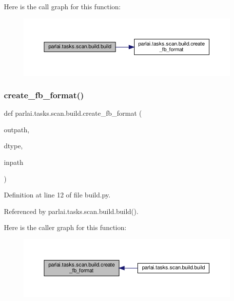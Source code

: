 Here is the call graph for this function\+:
\nopagebreak
\begin{figure}[H]
\begin{center}
\leavevmode
\includegraphics[width=350pt]{namespaceparlai_1_1tasks_1_1scan_1_1build_ad191bbde08667e24f385a91cb8bd235a_cgraph}
\end{center}
\end{figure}
\mbox{\label{namespaceparlai_1_1tasks_1_1scan_1_1build_acd920598e2932f5f8db51dcf6e25a00c}} 
\subsubsection{\texorpdfstring{create\+\_\+fb\+\_\+format()}{create\_fb\_format()}}
{\footnotesize\ttfamily def parlai.\+tasks.\+scan.\+build.\+create\+\_\+fb\+\_\+format (\begin{DoxyParamCaption}\item[{}]{outpath,  }\item[{}]{dtype,  }\item[{}]{inpath }\end{DoxyParamCaption})}



Definition at line 12 of file build.\+py.



Referenced by parlai.\+tasks.\+scan.\+build.\+build().

Here is the caller graph for this function\+:
\nopagebreak
\begin{figure}[H]
\begin{center}
\leavevmode
\includegraphics[width=350pt]{namespaceparlai_1_1tasks_1_1scan_1_1build_acd920598e2932f5f8db51dcf6e25a00c_icgraph}
\end{center}
\end{figure}
